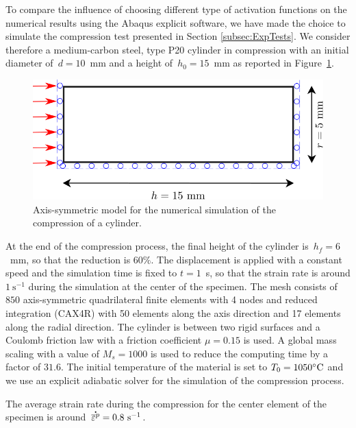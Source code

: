 \documentclass[algorithms,article,submit,pdftex,oneauthors]{Definitions/mdpi}
\DeclareRobustCommand{\mdot}[1]{\accentset{\mbox{\bfseries .}}{#1}}
\DeclareRobustCommand{\ps}{\text{s}^{-1}}
\DeclareRobustCommand{\GPa}{\text{GPa}}
\begin{document}
To compare the influence of choosing different type of activation functions on the numerical results using the Abaqus explicit software, we have made the choice to simulate the compression test presented in Section \ref{subsec:ExpTests}.
We consider therefore a medium-carbon steel, type P20 cylinder in compression with an initial diameter of~$d=10$~mm and a height of~$h_0=15$~mm as reported in Figure~\ref{fig:Num-model}.
\begin{figure}[h]
\centering
\includegraphics[width=0.65\columnwidth]{Figures/CyCompression}
\caption{Axis-symmetric model for the numerical simulation of the compression of a cylinder.}
\label{fig:Num-model}
\end{figure}
At the end of the compression process, the final height of the cylinder is~$h_f=6$~mm, so that the reduction is $60\%$. 
The displacement is applied with a constant speed and the simulation time is fixed to $t=1$~s, so that the strain rate is around $1~\ps$ during the simulation at the center of the specimen.
The mesh consists of $850$ axis-symmetric quadrilateral finite elements with 4 nodes and reduced integration (CAX4R) with 50 elements along the axis direction and 17 elements along the radial direction.
The cylinder is between two rigid surfaces and a Coulomb friction law with a friction coefficient $\mu=0.15$ is used.
A global mass scaling with a value of $M_s=1000$ is used to reduce the computing time by a factor of $31.6$.
The initial temperature of the material is set to $T_0=1050\celsius$ and we use an explicit adiabatic solver for the simulation of the compression process. 

The average strain rate during the compression for the center element of the specimen is around~$\mdot{\overline{\varepsilon}^p}=0.8~\ps$.
\end{document}
